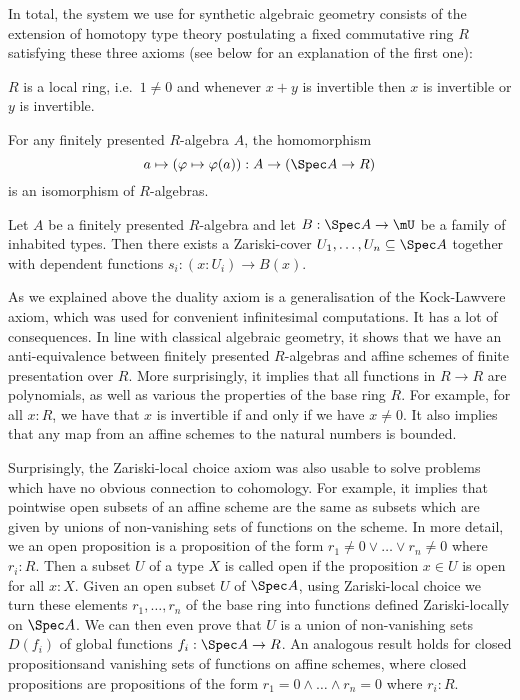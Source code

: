 In total, the system we use for synthetic algebraic geometry consists of the extension of homotopy type theory postulating a fixed commutative ring $R$ satisfying these three axioms (see below for an explanation of the first one):

\begin{center}
\begin{axiom}[Locality]%
  \label{loc-axiom}
  $R$ is a local ring, i.e.\ $1\neq 0$ and whenever $x+y$ is invertible then $x$ is invertible or $y$ is invertible.
\end{axiom}

\begin{axiom}[Duality]%
  \label{duality-axiom}
  For any finitely presented $R$-algebra $A$, the homomorphism
  \[ a \mapsto (\varphi\mapsto \varphi(a)) : A \to (\Spec A \to R)\]
  is an isomorphism of $R$-algebras.
\end{axiom}

\begin{axiom}%
  \label{Z-choice-axiom}
  Let $A$ be a finitely presented $R$-algebra
  and let $B : \Spec A \to \mU$ be a family of inhabited types.
  Then there exists a Zariski-cover $U_1,\dots,U_n\subseteq \Spec A$
  together with dependent functions $s_i : (x : U_i)\to B(x)$.
\end{axiom}
\end{center}

As we explained above the duality axiom is a generalisation of the Kock-Lawvere axiom, which was used for convenient infinitesimal computations. It has a lot of consequences. In line with classical algebraic geometry, it shows that we have an anti-equivalence between finitely presented $R$-algebras and affine schemes of finite presentation over $R$.
More surprisingly, it implies that all functions in $R\to R$ are polynomials, as well as various the properties of the base ring $R$.
For example, for all $x:R$, we have that $x$ is invertible if and only if we have $x\neq 0$.
It also implies that any map from an affine schemes to the natural numbers is bounded.

Surprisingly, the Zariski-local choice axiom was also usable to solve problems which have no obvious connection to cohomology.
For example, it implies that pointwise open subsets of an affine scheme are the same as subsets which are given by unions of non-vanishing sets of functions on the scheme.
In more detail, we an open proposition is a proposition of the form $r_1\neq 0 \vee\dots\vee r_n\neq 0$ where $r_i:R$.
Then a subset $U$ of a type $X$  is called open if the proposition $x\in U$ is open for all $x:X$.
Given an open subset $U$ of $\Spec A$, using Zariski-local choice we turn these elements $r_1,\dots,r_n$ of the base ring into functions defined Zariski-locally on $\Spec A$.
We can then even prove that $U$ is a union of non-vanishing sets $D(f_i)$ of global functions $f_i:\Spec A \to R$.
An analogous result holds for closed propositionsand vanishing sets of functions on affine schemes, where closed propositions are propositions of the form $r_1=0\wedge\dots\wedge r_n=0$ where $r_i:R$.

